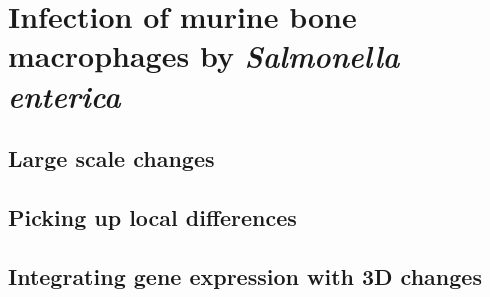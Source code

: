 
\chapter{Infection of murine bone macrophages by \textit{Salmonella enterica}} %

\label{ch:02-03} %


\section{Large scale changes}

\section{Picking up local differences}

\section{Integrating gene expression with 3D changes}

\blindtext